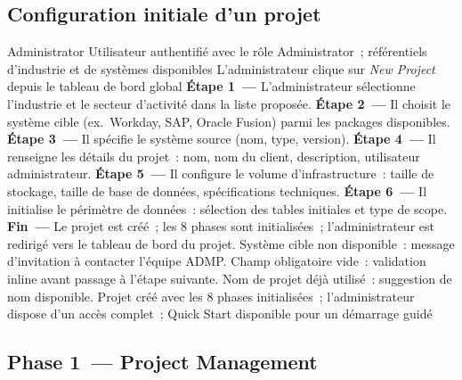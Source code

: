 
\subsection*{Configuration initiale d'un projet}

  {Administrator}
  {Utilisateur authentifié avec le rôle Administrator~; référentiels d'industrie et de systèmes disponibles}
  {L'administrateur clique sur \textit{New Project} depuis le tableau de bord global}
  {\textbf{Étape 1~---} L'administrateur sélectionne l'industrie et le secteur d'activité dans la liste proposée.\newline
   \textbf{Étape 2~---} Il choisit le système cible (ex.~Workday, SAP, Oracle Fusion) parmi les packages disponibles.\newline
   \textbf{Étape 3~---} Il spécifie le système source (nom, type, version).\newline
   \textbf{Étape 4~---} Il renseigne les détails du projet~: nom, nom du client, description, utilisateur administrateur.\newline
   \textbf{Étape 5~---} Il configure le volume d'infrastructure~: taille de stockage, taille de base de données, spécifications techniques.\newline
   \textbf{Étape 6~---} Il initialise le périmètre de données~: sélection des tables initiales et type de scope.\newline
   \textbf{Fin~---} Le projet est créé~; les 8 phases sont initialisées~; l'administrateur est redirigé vers le tableau de bord du projet.}
  {Système cible non disponible~: message d'invitation à contacter l'équipe ADMP. Champ obligatoire vide~: validation inline avant passage à l'étape suivante. Nom de projet déjà utilisé~: suggestion de nom disponible.}
  {Projet créé avec les 8 phases initialisées~; l'administrateur dispose d'un accès complet~; Quick Start disponible pour un démarrage guidé}

\subsection*{Phase 1~--- Project Management}

